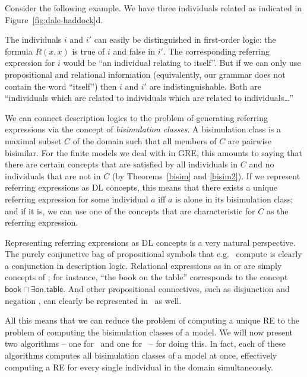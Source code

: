 Consider the following example.  We have three individuals related as indicated in
Figure~\ref{fig:dale-haddock}d.

%
The individuals $i$ and $i'$ can easily be distinguished in first-order logic:
the formula $R(x,x)$ is true of $i$ and false in $i'$. The corresponding
referring expression for $i$ would be ``an individual relating to itself''.
But if we can only use propositional and relational information (equivalently, our grammar does not contain the word ``itself'') then $i$ and $i'$ are indistinguishable. Both
are ``individuals which are related to individuals which are related to individuals\ldots''

We can connect description logics to the problem of generating
referring expressions via the concept of \emph{bisimulation classes}.
A bisimulation class is a maximal subset $C$ of the domain such that
all members of $C$ are pairwise bisimilar.  For the finite models we
deal with in GRE, this amounts to saying that there are certain
concepts that are satisfied by all individuals in $C$ and no
individuals that are not in $C$ (by Theorems~\ref{bisim} and
\ref{bisim2}).  If we represent referring expressions as DL concepts,
this means that there exists a unique referring expression for some
individual $a$ iff $a$ is alone in its bisimulation class; and if it
is, we can use one of the concepts that are characteristic for $C$ as
the referring expression.

Representing referring expressions as DL concepts is a very natural
perspective.  The purely conjunctive bag of propositional symbols that
e.g.\  compute is clearly a conjunction in
description logic.  Relational expressions as in
 or
 are simply concepts of \el; for instance, ``the
book on the table'' corresponds to the concept $\mathsf{book} \sqcap
\exists \mathsf{on}. \mathsf{table}$.  And other propositional
connectives, such as disjunction and negation
\cite{deemter01:_gener_refer_expres}, can clearly be represented in
\alc\ as well.

All this means that we can reduce the problem of computing a unique RE
to the problem of computing the bisimulation classes of a model.  We
will now present two algorithms -- one for \alc\ and one for \el\ --
for doing this.  In fact, each of these algorithms computes all
bisimulation classes of a model at once, effectively computing a RE
for every single individual in the domain simultaneously.


